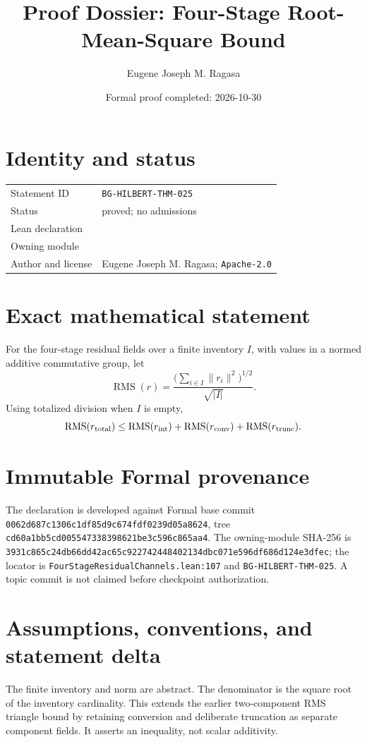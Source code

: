 \documentclass[11pt]{article}
\title{Proof Dossier: Four-Stage Root-Mean-Square Bound}
\author{Eugene Joseph M. Ragasa}
\date{Formal proof completed: 2026-10-30}
\begin{document}
\raggedright
\maketitle
\section{Identity and status}
\begin{tabularx}{\textwidth}{@{}lY@{}}
\toprule
Statement ID & \texttt{BG-HILBERT-THM-025} \\
Status & proved; no admissions \\
Lean declaration &  \\
Owning module &  \\
Author and license & Eugene Joseph M. Ragasa; \texttt{Apache-2.0} \\
\bottomrule
\end{tabularx}

\section{Exact mathematical statement}
For the four-stage residual fields over a finite inventory $I$, with values in a normed additive commutative group, let
\[
 \operatorname{RMS}(r)=\frac{\bigl(\sum_{i\in I}\|r_i\|^2\bigr)^{1/2}}{\sqrt{|I|}}.
\]
Using totalized division when $I$ is empty,
\[
 \operatorname{RMS}(r_{\rm total})\le
 \operatorname{RMS}(r_{\rm int})+
 \operatorname{RMS}(r_{\rm conv})+
 \operatorname{RMS}(r_{\rm trunc}).
\]

\section{Immutable Formal provenance}
The declaration is developed against Formal base commit
\texttt{0062d687c1306c1df85d9c674fdf0239d05a8624}, tree
\texttt{cd60a1bb5cd005547338398621be3c596c865aa4}. The owning-module SHA-256 is
\texttt{3931c865c24db66dd42ac65c922742448402134dbc071e596df686d124e3dfec}; the locator is
\texttt{FourStageResidualChannels.lean:107} and \texttt{BG-HILBERT-THM-025}. A topic commit is not claimed before checkpoint authorization.

\section{Assumptions, conventions, and statement delta}
The finite inventory and norm are abstract. The denominator is the square root of the inventory cardinality. This extends the earlier two-component RMS triangle bound by retaining conversion and deliberate truncation as separate component fields. It asserts an inequality, not scalar additivity.
\end{document}

